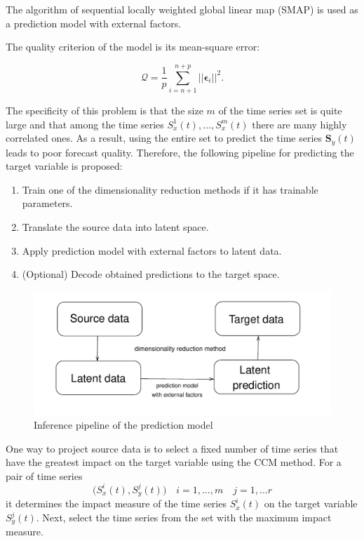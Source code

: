 \documentclass[bst/sn-mathphys]{sn-jnl}%
\newcommand{\bS}{\mathbf{S}}
\theoremstyle{thmstyleone}%
\theoremstyle{thmstyletwo}%
\theoremstyle{thmstylethree}%
\begin{document}
The algorithm of sequential locally weighted global linear map (SMAP) \cite{sugihara1994nonlinear} is used as a prediction model with external factors.

The quality criterion of the model is its mean-square error:

\begin{equation*}
	\mathcal{Q} = \dfrac{1}{p} \sum\limits_{i=n+1}^{n+p} ||\boldsymbol{\epsilon}_i||^2.
\end{equation*}

The specificity of this problem is that the size $m$ of the time series set is quite large and that among the time series $S_x^1(t), \ldots, S_x^m(t)$ there are many highly correlated ones.
As a result, using the entire set to predict the time series $\bS_y(t)$ leads to poor forecast quality.
Therefore, the following pipeline for predicting the target variable is proposed:

\begin{enumerate}
	\item Train one of the dimensionality reduction methods if it has trainable parameters.
	\item Translate the source data into latent space.
	\item Apply prediction model with external factors to latent data.
	\item (Optional) Decode obtained predictions to the target space.
\end{enumerate}

\begin{figure}[bhtp]
	\includegraphics[width=\textwidth]{inference_pipeline}
	\caption{Inference pipeline of the prediction model}
\end{figure}


One way to project source data is to select a fixed number of time series that have the greatest impact on the target variable using the CCM method.
For a pair of time series
\begin{equation*}
	\bigl(S_x^i(t), S_y^j(t) \bigr) \quad i = 1, \ldots, m \quad j = 1, \ldots r
\end{equation*} 
it determines the impact measure of the time series $S_x^i(t)$ on the target variable $S_y^j(t)$.
Next, select the time series from the set with the maximum impact measure.
\end{document}
